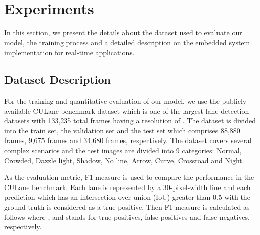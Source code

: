 \documentclass[conference]{IEEEtran}
\begin{document}
\section{Experiments}
\label{sec:Experiments}
In this section, we present the details about the dataset used to evaluate our model, the training process and a detailed description on the embedded system implementation for real-time applications.

\subsection{Dataset Description}
\label{ssec:datasets}

For the training and quantitative evaluation of our model, we use the publicly available CULane \cite{pan2018SCNN} benchmark dataset which is one of the largest lane detection datasets with 133,235 total frames having a resolution of . The dataset is divided into the train set, the validation set and the test set which comprises 88,880 frames, 9,675 frames and 34,680 frames, respectively. The dataset covers several complex scenarios and the test images are divided into 9 categories: Normal, Crowded, Dazzle light, Shadow, No line, Arrow, Curve, Crossroad and Night. 

As the evaluation metric, F1-measure is used to compare the performance in the CULane benchmark. Each lane is represented by a 30-pixel-width line and each prediction which has an intersection over union (IoU) greater than 0.5 with the ground truth is considered as a true positive. Then F1-measure is calculated as follows where ,  and  stands for true positives, false positives and false negatives, respectively.
\end{document}
